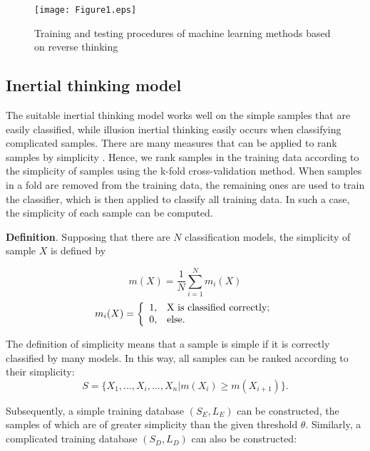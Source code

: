 \begin{figure*}[htbp]
 \centering
  \texttt{[image: Figure1.eps]}
\caption{Training and testing procedures of machine learning methods based on reverse thinking}
\label{Figure1}
\end{figure*}

\subsection{Inertial thinking model}
The suitable inertial thinking model works well on the simple samples that are easily classified, while illusion inertial thinking easily occurs when classifying complicated samples. There are many measures that can be applied to rank samples by simplicity \cite{Smith2014}. Hence, we rank samples in the training data according to the simplicity of samples using the k-fold cross-validation method. When samples in a fold are removed from the training data, the remaining ones are used to train the classifier, which is then applied to classify all training data. In such a case, the simplicity of each sample can be computed.

\textbf{Definition}. Supposing that there are $N$ classification models, the simplicity of sample $X$ is defined by

\begin{equation}
    m(X)=\frac{1}{N}\sum_{i=1}^N m_i(X)
\end{equation}
\begin{displaymath}
    m_i(X)=  \left\{
               \begin{array}{ll}
                 1, & \hbox{X is classified correctly;} \\
                 0, & \hbox{else.}
               \end{array}
             \right.
\end{displaymath}

The definition of simplicity means that a sample is simple if it is correctly classified by many models. In this way, all samples can be ranked according to their simplicity:
\begin{displaymath}
    S=\{X_1,...,X_i,...,X_n|m(X_i)\geq m(X_{i+1})\}.
\end{displaymath}

Subsequently, a simple training database $(S_E,L_E)$ can be constructed, the samples of which are of greater simplicity than the given threshold $\theta$. Similarly, a complicated training database $(S_D,L_D)$ can also be constructed:

